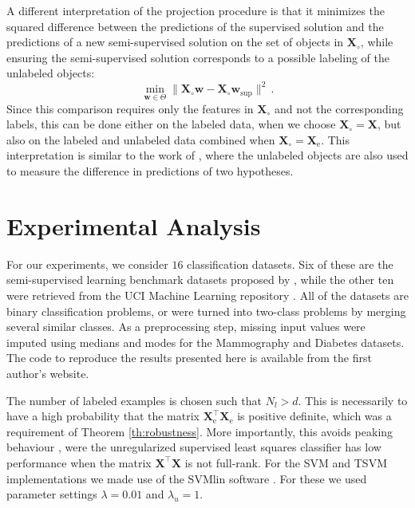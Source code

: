 \documentclass[twoside]{memoir}\usepackage[]{graphicx}\usepackage{xcolor}
\renewcommand{\cite}{\citep}
\newcommand{\Xe}{\mathbf{X}_\mathrm{e}  }
\renewcommand{\vec}{\mathbf}
\begin{document}
A different interpretation of the projection procedure is that it minimizes the squared difference between the predictions of the supervised solution and the predictions of a new semi-supervised solution on the set of objects in $\vec{X}_{\circ}$, while ensuring the semi-supervised solution corresponds to a possible labeling of the unlabeled objects:
\begin{equation}
\min_{\vec{w} \in \Theta} \lVert \vec{X}_{\circ} \vec{w} - \vec{X}_{\circ} \vec{w}_\text{sup} \lVert^2 \,.\nonumber
\end{equation}
Since this comparison requires only the features in $\vec{X}_{\circ}$ and not the corresponding labels, this can be done either on the labeled data, when we choose $\vec{X}_{\circ}=\vec{X}$, but also on the labeled and unlabeled data combined when $\vec{X}_{\circ}=\Xe$. This interpretation is similar to the work of \cite{Schuurmans2002}, where the unlabeled objects are also used to measure the difference in predictions of two hypotheses. 

\section{Experimental Analysis}
\label{section:empirical}
For our experiments, we consider $16$ classification datasets. Six of these are the semi-supervised learning benchmark datasets proposed by \citet{Chapelle2006}, while the other ten were retrieved from the UCI Machine Learning repository \citep{Lichman2013}. All of the datasets are binary classification problems, or were turned into two-class problems by merging several similar classes. As a preprocessing step, missing input values were imputed using medians and modes for the Mammography and Diabetes datasets. The code to reproduce the results presented here is available from the first author's website.

The number of labeled examples is chosen such that $N_l>d$. This is necessarily to have a high probability that the matrix $\vec{X}_\text{e}^\top \vec{X}_\text{e}$ is positive definite, which was a requirement of Theorem \ref{th:robustness}. More importantly, this avoids peaking behaviour \citep{Raudys1998, Opper1995}, were the unregularized supervised least squares classifier has low performance when the matrix $\vec{X}^\top \vec{X}$ is not full-rank. For the SVM and TSVM implementations we made use of the SVMlin software \citep{Sindhwani2006}. For these we used parameter settings $\lambda=0.01$ and $\lambda_u=1$.
\end{document}
